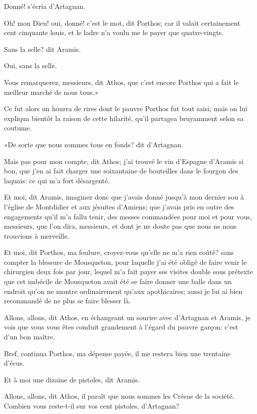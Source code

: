 \speak  Donné! s'écria d'Artagnan. 

\speak  Oh! mon Dieu! oui, donné! c'est le mot, dit Porthos; car il valait certainement cent cinquante louis, et le ladre n'a voulu me le payer que quatre-vingts. 

\speak  Sans la selle? dit Aramis. 

\speak  Oui, sans la selle. 

\speak  Vous remarquerez, messieurs, dit Athos, que c'est encore Porthos qui a fait le meilleur marché de nous tous.» 

Ce fut alors un hourra de rires dont le pauvre Porthos fut tout saisi; mais on lui expliqua bientôt la raison de cette hilarité, qu'il partagea bruyamment selon sa coutume. 

«De sorte que nous sommes tous en fonds? dit d'Artagnan. 

\speak  Mais pas pour mon compte, dit Athos; j'ai trouvé le vin d'Espagne d'Aramis si bon, que j'en ai fait charger une soixantaine de bouteilles dans le fourgon des laquais: ce qui m'a fort désargenté. 

\speak  Et moi, dit Aramis, imaginez donc que j'avais donné jusqu'à mon dernier sou à l'église de Montdidier et aux jésuites d'Amiens; que j'avais pris en outre des engagements qu'il m'a fallu tenir, des messes commandées pour moi et pour vous, messieurs, que l'on dira, messieurs, et dont je ne doute pas que nous ne nous trouvions à merveille. 

\speak  Et moi, dit Porthos, ma foulure, croyez-vous qu'elle ne m'a rien coûté? sans compter la blessure de Mousqueton, pour laquelle j'ai été obligé de faire venir le chirurgien deux fois par jour, lequel m'a fait payer ses visites double sous prétexte que cet imbécile de Mousqueton avait été se faire donner une balle dans un endroit qu'on ne montre ordinairement qu'aux apothicaires; aussi je lui ai bien recommandé de ne plus se faire blesser là. 

\speak  Allons, allons, dit Athos, en échangeant un sourire avec d'Artagnan et Aramis, je vois que vous vous êtes conduit grandement à l'égard du pauvre garçon: c'est d'un bon maître. 

\speak  Bref, continua Porthos, ma dépense payée, il me restera bien une trentaine d'écus. 

\speak  Et à moi une dizaine de pistoles, dit Aramis. 

\speak  Allons, allons, dit Athos, il paraît que nous sommes les Crésus de la société. Combien vous reste-t-il sur vos cent pistoles, d'Artagnan? 


